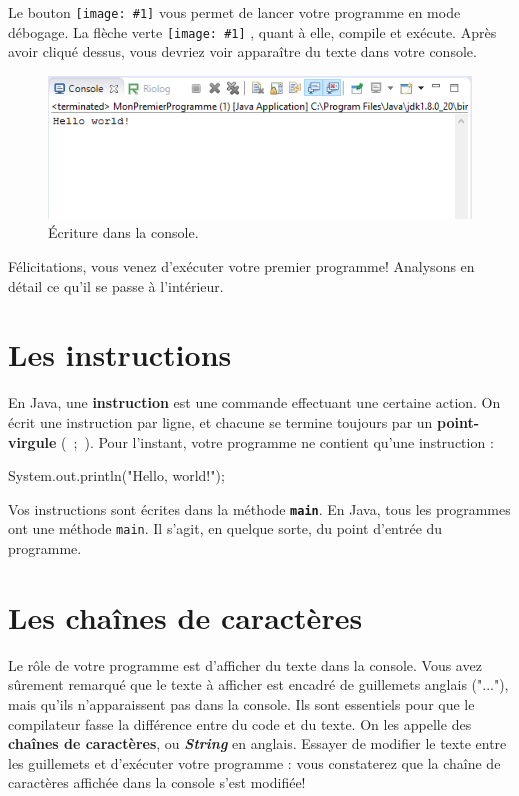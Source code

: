 \documentclass[12pt]{report}
\newcommand{\inlinepic}[1]{%
  \begingroup\normalfont
  \texttt{[image: \#1]}%
  \endgroup
}
\begin{document}
%
Le bouton \inlinepic{debug-btn-eclipse.png} vous permet de lancer votre programme en mode débogage. La flèche verte \inlinepic{execute-btn-eclipse.png}, quant à elle, compile et exécute. Après avoir cliqué dessus, vous devriez voir apparaître du texte dans votre console.
%
%
\begin{figure}[!ht]
	\centering
	\includegraphics[scale=1]{ecriture-console.png}
	\caption{Écriture dans la console.}
\end{figure}

Félicitations, vous venez d'exécuter votre premier programme! Analysons en détail ce qu'il se passe à l'intérieur.






%
\section{Les instructions}
En Java, une \textbf{instruction} est une commande effectuant une certaine action. On écrit une instruction par ligne, et chacune se termine toujours par un \textbf{point-virgule} (\ {;}\ ). Pour l'instant, votre programme ne contient qu'une instruction : 
\begin{code}
System.out.println("Hello, world!");
\end{code}
Vos instructions sont écrites dans la méthode \texttt{\bfseries main}. En Java, tous les programmes ont une méthode \texttt{main}. Il s'agit, en quelque sorte, du point d'entrée du programme.





%
\section{Les chaînes de caractères}
%
Le rôle de votre programme est d'afficher du texte dans la console. Vous avez sûrement remarqué que le texte à afficher est encadré de guillemets anglais ("..."), mais qu'ils n'apparaissent pas dans la console. Ils sont essentiels pour que le compilateur fasse la différence entre du code et du texte. On les appelle des \textbf{chaînes de caractères}, ou \emph{\bfseries String} en anglais. Essayer de modifier le texte entre les guillemets et d'exécuter votre programme : vous constaterez que la chaîne de caractères affichée dans la console s'est modifiée!
\end{document}
